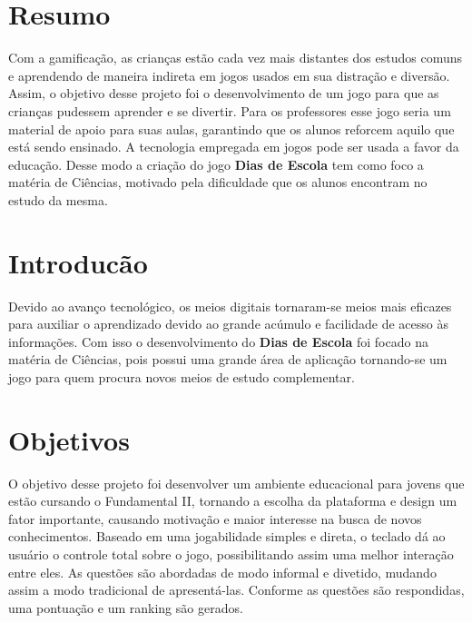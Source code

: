 \documentclass{sciposter}
\begin{document}
\begin{multicols}{2}

\section{Resumo}
 
Com a gamificação, as crianças estão cada vez mais distantes dos estudos comuns e aprendendo de maneira indireta em jogos usados em sua distração e diversão. Assim, o objetivo desse projeto foi o desenvolvimento de um jogo para que as crianças pudessem aprender e se divertir. Para os professores esse jogo seria um material de apoio para suas aulas, garantindo que os alunos reforcem aquilo que está sendo ensinado. A tecnologia empregada em jogos pode ser usada a favor da educação. Desse modo a criação do jogo \textbf{Dias de Escola} tem como foco a matéria de Ciências, motivado pela dificuldade que os alunos encontram no estudo da mesma. 

 

\section{Introducão}
Devido ao avanço tecnológico, os meios digitais tornaram-se meios mais eficazes para auxiliar o aprendizado devido ao grande acúmulo e facilidade de acesso às informações. Com isso o desenvolvimento do \textbf{Dias de Escola} foi focado na matéria de Ciências, pois possui uma grande área de aplicação tornando-se um jogo para quem procura novos meios de estudo complementar.

\newline
\section{Objetivos}

O objetivo desse projeto foi desenvolver um ambiente educacional para jovens que estão cursando o Fundamental II, tornando a escolha da plataforma e design um fator importante, causando motivação e maior interesse na busca de novos conhecimentos.
Baseado em uma jogabilidade simples e direta, o teclado dá ao usuário o controle total sobre o jogo, possibilitando assim uma melhor interação entre eles.
As questões são abordadas de modo informal e divetido, mudando assim a modo tradicional de apresentá-las. Conforme as questões são respondidas, uma pontuação e um ranking são gerados.


\end{multicols}
\end{document}
